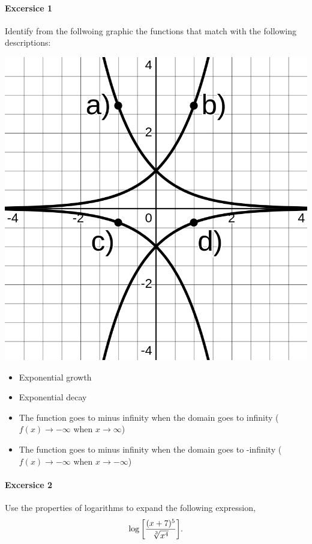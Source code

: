 \documentclass[main.tex]{subfiles}
\begin{document}
\paragraph{Excersice 1}
Identify from the follwoing graphic the functions that match with the following descriptions:

\begin{minipage}[c]{0.45\textwidth}
    \centering
    \includegraphics[width=\textwidth]{../imgs/exp-log/exponentials.png}
\end{minipage}
\begin{minipage}[c]{0.45\textwidth}
\begin{itemize}
    \item Exponential growth 
    \item Exponential decay
    \item The function goes to minus infinity when the domain goes to infinity ($f(x)\to-\infty$ when $x\to\infty$)
    \item  The function goes to minus infinity when the domain goes to -infinity ($f(x)\to-\infty$ when $x\to-\infty$)
\end{itemize}
\end{minipage}

\paragraph{Excersice 2}
Use the properties of logarithms to expand the following expression, \[\log\qty[\frac{(x+7)^5}{\sqrt[3]{x^4}}].\]
\end{document}
